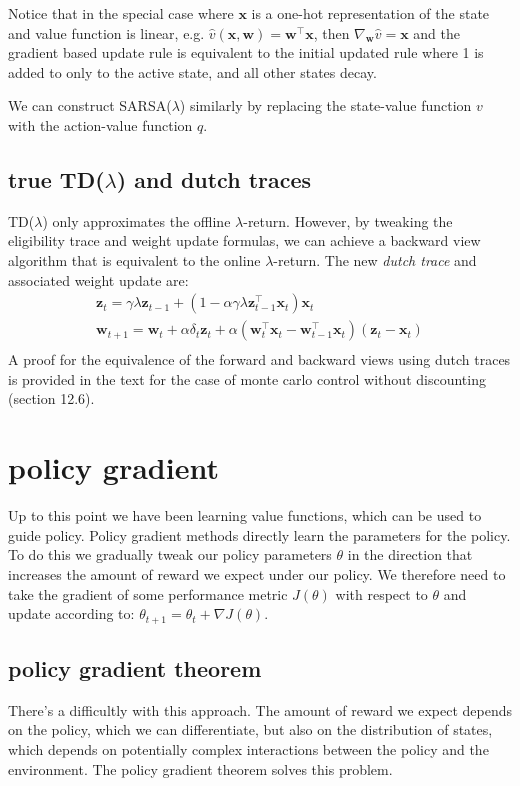 Notice that in the special case where $\mathbf{x}$ is a one-hot representation of the state and value function is linear, e.g. $\hat{v}(\mathbf{x}, \mathbf{w}) = \mathbf{w}^\top \mathbf{x}$, then $\nabla_\mathbf{w} \hat{v} = \mathbf{x}$ and the gradient based update rule is equivalent to the initial updated rule where 1 is added to only to the active state, and all other states decay.

We can construct SARSA($\lambda$) similarly by replacing the state-value function $v$ with the action-value function $q$.

\subsection{true TD($\lambda$) and dutch traces}
TD($\lambda$) only approximates the offline $\lambda$-return. However, by tweaking the eligibility trace and weight update formulas, we can achieve a backward view algorithm that is equivalent to the online $\lambda$-return. The new \textit{dutch trace} and associated weight update are:
\begin{gather*}
\mathbf{z}_{t} = \gamma \lambda \mathbf{z}_{t-1} + (1 - \alpha \gamma \lambda\mathbf{z}_{t-1}^\top \mathbf{x}_{t})\mathbf{x}_{t} \\
\mathbf{w}_{t+1} = \mathbf{w}_{t} + \alpha \delta_t \mathbf{z}_{t} + \alpha (\mathbf{w}_{t}^\top\mathbf{x}_{t} - \mathbf{w}_{t-1}^\top\mathbf{x}_{t}) (\mathbf{z}_{t} - \mathbf{x}_{t})\\
\end{gather*}
A proof for the equivalence of the forward and backward views using dutch traces is provided in the text for the case of monte carlo control without discounting (section 12.6).

\section{policy gradient}
Up to this point we have been learning value functions, which can be used to guide policy. Policy gradient methods directly learn the parameters for the policy. To do this we gradually tweak our policy parameters $\theta$ in the direction that increases the amount of reward we expect under our policy. We therefore need to take the gradient of some performance metric $J(\theta)$ with respect to $\theta$ and update according to: $\theta_{t+1} = \theta_t + \nabla J(\theta)$.

\subsection{policy gradient theorem}
There's a difficultly with this approach. The amount of reward we expect depends on the policy, which we can differentiate, but also on the distribution of states, which depends on potentially complex interactions between the policy and the environment. The policy gradient theorem solves this problem. 

